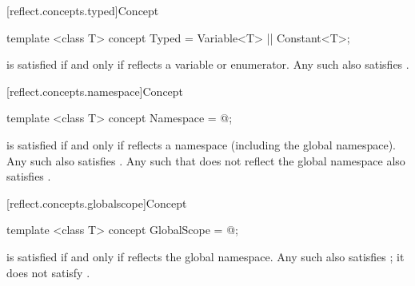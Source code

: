 [reflect.concepts.typed]{Concept }

\begin{std.txt}\color{addclr}

\begin{itemdecl}
template <class T> concept Typed = Variable<T> || Constant<T>;
\end{itemdecl}

\begin{itemdescr}
\pnum
{} is satisfied if and only if  reflects a variable or enumerator.  Any such  also satisfies .

\end{itemdescr}
\end{std.txt}

[reflect.concepts.namespace]{Concept }

\begin{std.txt}\color{addclr}

\begin{itemdecl}
template <class T> concept Namespace = @\seebelow@;
\end{itemdecl}

\begin{itemdescr}
\pnum
{} is satisfied if and only if  reflects a namespace (including the global namespace). Any such  also satisfies . Any such  that does not reflect the global namespace also satisfies .

\end{itemdescr}
\end{std.txt}

[reflect.concepts.globalscope]{Concept }

\begin{std.txt}\color{addclr}

\begin{itemdecl}
template <class T> concept GlobalScope = @\seebelow@;
\end{itemdecl}

\begin{itemdescr}
\pnum
{} is satisfied if and only if  reflects the global namespace. Any such  also satisfies ; it does not satisfy .

\end{itemdescr}
\end{std.txt}

